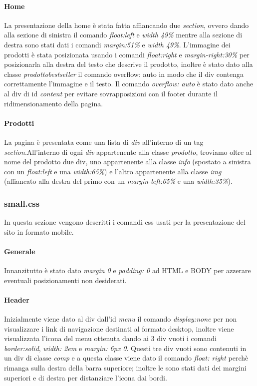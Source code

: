 \paragraph{Home} \Spazio
La presentazione della home è stata fatta affiancando due \emph{section}, ovvero dando alla sezione di sinistra il comando \emph{float:left} e \emph{width 49\%} mentre alla sezione di destra sono stati dati i comandi \emph{margin:51\%} e \emph{width 49\%}. 
L'immagine dei prodotti è stata posizionata usando i comandi \emph{float:right} e \emph{margin-right:30\%} per posizionarla alla destra del testo che descrive il prodotto, inoltre è stato dato alla classe \emph{prodottobestseller} il comando overflow: auto in modo che il div contenga correttamente l'immagine e il testo.
Il comando \emph{overflow: auto} è stato dato anche al div di id \emph{content} per evitare sovrapposizioni con il footer durante il ridimensionamento della pagina.

\paragraph{Prodotti} \Spazio
La pagina è presentata come una lista di \emph{div} all'interno di un tag \emph{section}.\newline All'interno di ogni \emph{div} appartenente alla classe \emph{prodotto}, troviamo oltre al nome del prodotto due div, uno appartenente alla classe \emph{info} (spostato a sinistra con un \emph{float:left} e una \emph{width:65\%}) e l'altro appartenente alla classe \emph{img} (affiancato alla destra del primo con un \emph{margin-left:65\%} e una \emph{width:35\%}). 


\subsubsection{small.css}
In questa sezione vengono descritti i comandi css usati per la presentazione del sito in formato mobile.

\paragraph{Generale} \Spazio
Innanzitutto è stato dato \emph{margin 0} e \emph{padding: 0} ad HTML e BODY per azzerare eventuali posizionamenti non desiderati. 

\paragraph{Header} \Spazio
Inizialmente viene dato al div dall'id \emph{menu} il comando \emph{display:none} per non visualizzare i link di navigazione destinati al formato desktop, inoltre viene visualizzata l'icona del menu ottenuta dando ai 3 div vuoti i comandi \emph{border:solid}, \emph{width: 2em} e \emph{margin: 6px 0}. Questi tre div vuoti sono contenuti in un div di classe \emph{comp} e a questa classe viene dato il comando \emph{float: right} perchè rimanga sulla destra della barra superiore; inoltre le sono stati dati dei margini superiori e di destra per distanziare l'icona dai bordi.

